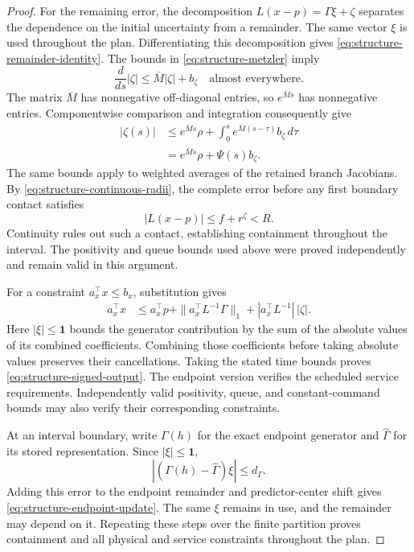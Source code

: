 \documentclass[preprint,12pt]{elsarticle}
\begin{document}
\begin{proof}
For the remaining error, the decomposition
$L(x-p)=\Gamma\xi+\zeta$ separates the dependence on the initial
uncertainty from a remainder. The same vector $\xi$ is used throughout the
plan. Differentiating this decomposition gives
\eqref{eq:structure-remainder-identity}. The bounds in
\eqref{eq:structure-metzler} imply
\[
 \frac{d}{ds}|\zeta|\le\overline M|\zeta|+b_\zeta
 \quad\text{almost everywhere}.
\]
The matrix $\overline M$ has nonnegative off-diagonal entries, so
$e^{\overline M s}$ has nonnegative entries. Componentwise comparison and
integration consequently give
\[
\begin{aligned}
 |\zeta(s)|
 &\le e^{\overline M s}\rho+
       \int_0^s e^{\overline M(s-\tau)}b_\zeta\,d\tau\\
 &=e^{\overline M s}\rho+\Psi(s)b_\zeta.
\end{aligned}
\]
The same bounds apply to weighted averages of the retained branch
Jacobians. By \eqref{eq:structure-continuous-radii}, the complete error
before any first boundary contact satisfies
\[
 |L(x-p)|\le f+r^\zeta<R.
\]
Continuity rules out such a contact, establishing containment throughout
the interval. The positivity and queue bounds used above were proved
independently and remain valid in this argument.

For a constraint $a_x^\top x\le b_x$, substitution gives
\[
\begin{aligned}
 a_x^\top x
 &\le a_x^\top p+
       \|a_x^\top L^{-1}\Gamma\|_1+
       |a_x^\top L^{-1}|\,|\zeta|.
\end{aligned}
\]
Here $|\xi|\le\mathbf1$ bounds the generator contribution by the sum of
the absolute values of its combined coefficients. Combining those
coefficients before taking absolute values preserves their cancellations.
Taking the stated time bounds proves
\eqref{eq:structure-signed-output}. The endpoint version verifies the
scheduled service requirements. Independently valid positivity, queue,
and constant-command bounds may also verify their corresponding
constraints.

At an interval boundary, write $\Gamma(h)$ for the exact endpoint
generator and $\widehat\Gamma$ for its stored representation. Since
$|\xi|\le\mathbf1$,
\[
 |(\Gamma(h)-\widehat\Gamma)\xi|\le d_\Gamma.
\]
Adding this error to the endpoint remainder and predictor-center shift
gives \eqref{eq:structure-endpoint-update}. The same $\xi$ remains in use,
and the remainder may depend on it. Repeating these steps over the finite
partition proves containment and all physical and service constraints
throughout the plan.
\end{proof}
\end{document}
